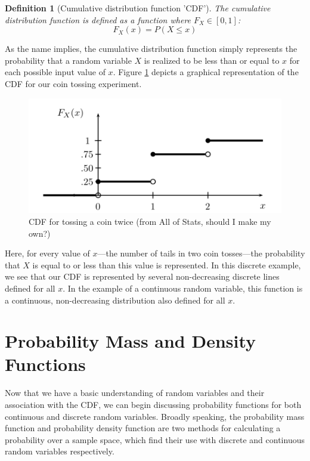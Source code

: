 \documentclass[
  12pt,
]{book}
\theoremstyle{definition}
\newtheorem{definition}{Definition}[chapter]
\theoremstyle{definition}
\theoremstyle{definition}
\theoremstyle{remark}
\begin{document}
\begin{definition}[Cumulative distribution function 'CDF']
\protect\hypertarget{def:cdf}{}{\label{def:cdf} {} }\emph{The cumulative distribution function is defined as a function where \(F_{X}\in[0, 1]\):}
\[F_{X}(x)=P(X≤x)\]
\end{definition}

As the name implies, the cumulative distribution function simply represents the probability that a random variable \(X\) is realized to be less than or equal to \(x\) for each possible input value of \(x\).
Figure \ref{fig:cdfimg} depicts a graphical representation of the CDF for our coin tossing experiment.

\begin{figure}

{\centering \includegraphics[width=0.7\linewidth]{./images/cdf} 

}

\caption{CDF for tossing a coin twice (from All of Stats, should I make my own?)}\label{fig:cdfimg}
\end{figure}

Here, for every value of \(x\)---the number of tails in two coin tosses---the probability that \(X\) is equal to or less than this value is represented.
In this discrete example, we see that our CDF is represented by several non-decreasing discrete lines defined for all \(x\).
In the example of a continuous random variable, this function is a continuous, non-decreasing distribution also defined for all \(x\).

\hypertarget{probability-mass-and-density-functions}{%
\section{Probability Mass and Density Functions}\label{probability-mass-and-density-functions}}

Now that we have a basic understanding of random variables and their association with the CDF, we can begin discussing probability functions for both continuous and discrete random variables.
Broadly speaking, the probability mass function and probability density function are two methods for calculating a probability over a sample space, which find their use with discrete and continuous random variables respectively.
\end{document}
